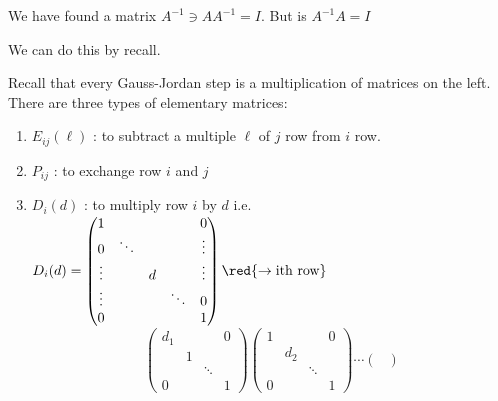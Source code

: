 \begin{exercise}
We have found a matrix $A^{-1} \ni AA^{-1} = I$. But is $A^{-1}A = I$
\end{exercise}
\begin{answer}
    We can do this by recall.
    \begin{prev}
        Recall that every Gauss-Jordan step is a multiplication of matrices on the left. There are three types of elementary matrices:
    \end{prev}
    \begin{enumerate}[$\arabic*^\circ$]
        \item $\boxed{E_{ij}(\ell)}$ : to subtract a multiple $\ell$ of $j$ row from $i$ row.
        \item $\boxed{P_{ij}}$ : to exchange row $i$ and $j$
        \item $\boxed{D_i(d)}$ : to multiply row $i$ by $d$ i.e. $D_i(d) = \begin{pmatrix}
            1 & & & & 0 \\
            0 & \ddots & & & \vdots\\
            \vdots & & d & & \vdots \\
            \vdots &  & & \ddots & 0\\
            0 & & & &  1 \\
        \end{pmatrix} \begin{matrix}
            \\ \\ \red{\rightarrow \text{ith row}} \\ \\ \\
        \end{matrix}$
        \[
            \begin{pmatrix}
                d_1 & & & 0\\
                 & 1 & & \\
                 & & \ddots & \\
                0 & & & 1
            \end{pmatrix} \begin{pmatrix}
                1 & & & 0\\
                 & d_2 & & \\
                 & & \ddots & \\
                0 & & & 1
            \end{pmatrix} \cdots \begin{pmatrix}

\end{pmatrix}\]
\end{enumerate}
\end{answer}
